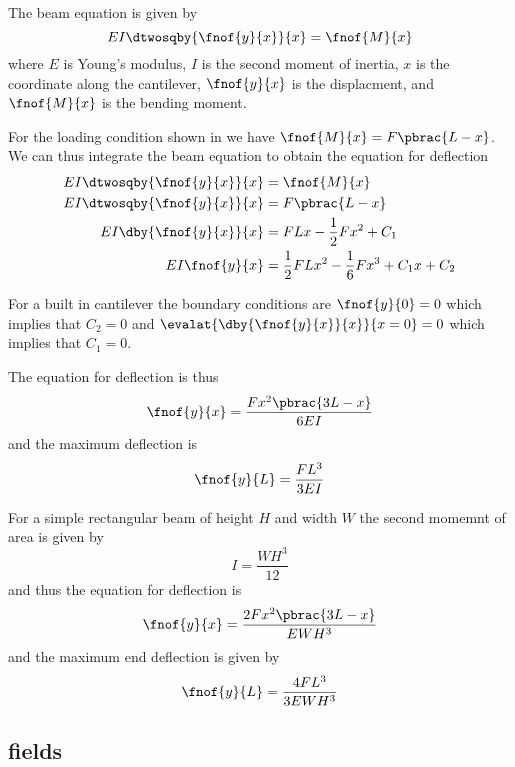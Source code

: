 The beam equation is given by
\begin{equation}
  EI\dtwosqby{\fnof{y}{x}}{x}=\fnof{M}{x}
\end{equation}
where $E$ is Young's modulus, $I$ is the second moment of inertia, $x$
is the coordinate along the cantilever, $\fnof{y}{x}$ is the
displacment, and $\fnof{M}{x}$ is the bending moment.

For the loading condition shown in  we
have $\fnof{M}{x}=F\pbrac{L-x}$. We can thus integrate the beam
equation to obtain the equation for deflection \ie
\begin{equation}
  \begin{aligned}
    EI\dtwosqby{\fnof{y}{x}}{x}&=\fnof{M}{x}\\
    EI\dtwosqby{\fnof{y}{x}}{x}&=F\pbrac{L-x}\\
    EI\dby{\fnof{y}{x}}{x}&=FLx-\frac{1}{2}Fx^{2}+C_{1}\\
    EI\fnof{y}{x}&=\frac{1}{2}FLx^{2}-\frac{1}{6}Fx^{3}+C_{1}x+C_{2}
  \end{aligned}
\end{equation}

For a built in cantilever the boundary conditions are $\fnof{y}{0}=0$
which implies that $C_{2}=0$ and
$\evalat{\dby{\fnof{y}{x}}{x}}{x=0}=0$ which implies that $C_{1}=0$.

The equation for deflection is thus
\begin{equation}
  \fnof{y}{x}=\dfrac{Fx^{2}\pbrac{3L-x}}{6EI}
\end{equation}
and the maximum deflection is
\begin{equation}
  \fnof{y}{L}=\dfrac{FL^{3}}{3EI}
\end{equation}

For a simple rectangular beam of height $H$ and width $W$ the second momemnt of area is given by
\begin{equation}
  I=\dfrac{WH^{3}}{12}
\end{equation}
and thus the equation for deflection is
\begin{equation}
  \fnof{y}{x}=\dfrac{2Fx^{2}\pbrac{3L-x}}{EWH^{3}}
\end{equation}
and the maximum end deflection is given by
\begin{equation}
  \fnof{y}{L}=\dfrac{4FL^{3}}{3EWH^{3}}
\end{equation}


\subsection{\OpenCMISS fields}
\label{subsec:LinearElasticityOpenCMISSFields}

